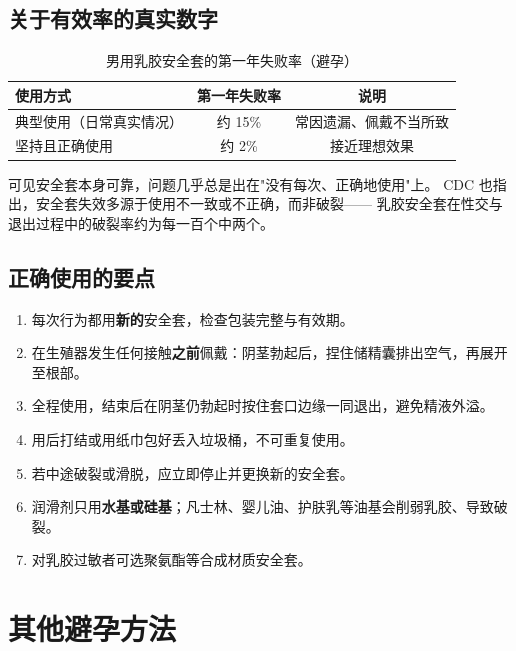 \subsection*{关于有效率的真实数字}

\begin{table}[htbp]
  \centering
  \caption{男用乳胶安全套的第一年失败率（避孕）}
  \begin{tabularx}{\textwidth}{@{}l C C@{}}
    \toprule
    \textbf{使用方式} & \textbf{第一年失败率} & \textbf{说明} \\
    \midrule
    典型使用（日常真实情况） & 约 15\% & 常因遗漏、佩戴不当所致 \\
    坚持且正确使用           & 约 2\%  & 接近理想效果 \\
    \bottomrule
  \end{tabularx}
\end{table}

可见安全套本身可靠，问题几乎总是出在"没有每次、正确地使用"上。
CDC 也指出，安全套失效多源于使用不一致或不正确，而非破裂——
乳胶安全套在性交与退出过程中的破裂率约为每一百个中两个。

\subsection*{正确使用的要点}

\begin{enumerate}[leftmargin=2em,itemsep=0.3em]
  \item 每次行为都用\textbf{新的}安全套，检查包装完整与有效期。
  \item 在生殖器发生任何接触\textbf{之前}佩戴：阴茎勃起后，捏住储精囊排出空气，再展开至根部。
  \item 全程使用，结束后在阴茎仍勃起时按住套口边缘一同退出，避免精液外溢。
  \item 用后打结或用纸巾包好丢入垃圾桶，不可重复使用。
  \item 若中途破裂或滑脱，应立即停止并更换新的安全套。
  \item 润滑剂只用\textbf{水基或硅基}；凡士林、婴儿油、护肤乳等油基会削弱乳胶、导致破裂。
  \item 对乳胶过敏者可选聚氨酯等合成材质安全套。
\end{enumerate}

\section{其他避孕方法}

